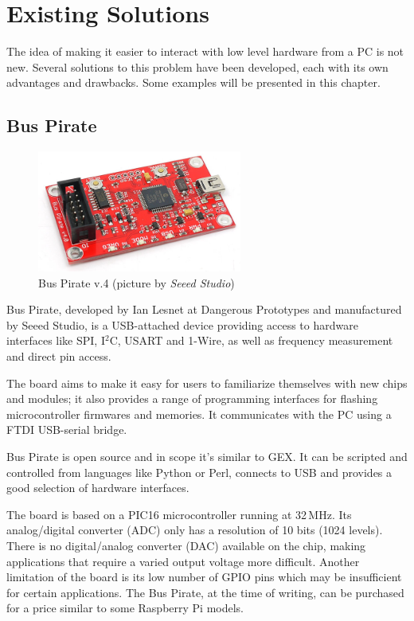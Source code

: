 \chapter{\label{sec:prior-art}Existing Solutions}

The idea of making it easier to interact with low level hardware from a PC is not new. Several solutions to this problem have been developed, each with its own advantages and drawbacks. Some examples will be presented in this chapter.

\section{Bus Pirate}

\begin{figure}[H]
	\centering
	\includegraphics[width=0.6\textwidth] {img/buspirate.jpg}
	\caption{\label{fig:buspirate}Bus Pirate v.4 (picture by \textit{Seeed Studio})}
\end{figure}



Bus Pirate, developed by Ian Lesnet at Dangerous Prototypes and manufactured by Seeed Studio, is a USB-attached device providing access to hardware interfaces like SPI, I$^2$C, USART and 1-Wire, as well as frequency measurement and direct pin access.

The board aims to make it easy for users to familiarize themselves with new chips and modules; it also provides a range of programming interfaces for flashing microcontroller firmwares and memories. It communicates with the PC using a FTDI USB-serial bridge.

Bus Pirate is open source and in scope it's similar to GEX. It can be scripted and controlled from languages like Python or Perl, connects to USB and provides a good selection of hardware interfaces.

The board is based on a PIC16 microcontroller running at 32\,MHz. Its analog/digital converter (ADC) only has a resolution of 10 bits (1024 levels). There is no digital/analog converter (DAC) available on the chip, making applications that require a varied output voltage more difficult. Another limitation of the board is its low number of GPIO pins which may be insufficient for certain applications. The Bus Pirate, at the time of writing, can be purchased for a price similar to some Raspberry Pi models.

